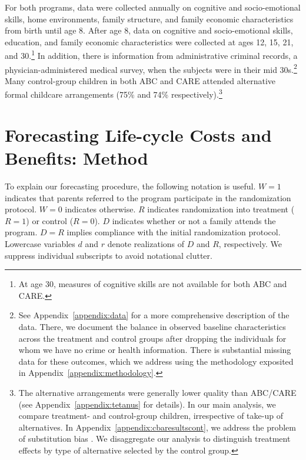 For both programs, data were collected annually on cognitive and socio-emotional skills, home environments, family structure, and family economic characteristics from birth until age 8. After age 8, data on cognitive and socio-emotional skills, education, and family economic characteristics were collected at ages 12, 15, 21, and 30.\footnote{At age 30, measures of cognitive skills are not available for both ABC and CARE.} In addition, there is information from administrative criminal records, a physician-administered medical survey, when the subjects were in their mid 30s.\footnote{See  Appendix~\ref{appendix:data} for a more comprehensive description of the data. There, we document the balance in observed baseline characteristics across the treatment and control groups after dropping the individuals for whom we have no crime or health information. There is substantial missing data for these outcomes, which we address using the methodology exposited in Appendix~\ref{appendix:methodology}.} Many control-group children in both ABC and CARE attended alternative formal childcare arrangements (75\% and 74\% respectively).\footnote{The alternative arrangements were generally lower quality than ABC/CARE (see Appendix~\ref{appendix:tetanus} for details). In our main analysis, we compare treatment- and control-group children, irrespective of take-up of alternatives. In Appendix~\ref{appendix:cbaresultscont}, we address the problem of substitution bias \citep{Heckman_1992_randomization,Heckman_Hohmann_etal_2000_QJE,Kline_Walters_2016_QJE}. We disaggregate our analysis to distinguish treatment effects by type of alternative selected by the control group.}

\section{Forecasting Life-cycle Costs and Benefits: Method} \label{section:cbamethodology}

\noindent To explain our forecasting procedure, the following notation is useful. $W=1$ indicates that parents referred to the program participate in the randomization protocol. $W=0$ indicates otherwise. $R$ indicates randomization into treatment ($R = 1$) or control ($R = 0$). $D$ indicates whether or not a family attends the program. $D= R$ implies compliance with the initial randomization protocol. Lowercase variables $d$ and $r$ denote realizations of $D$ and $R$, respectively. We suppress individual subscripts to avoid notational clutter.

